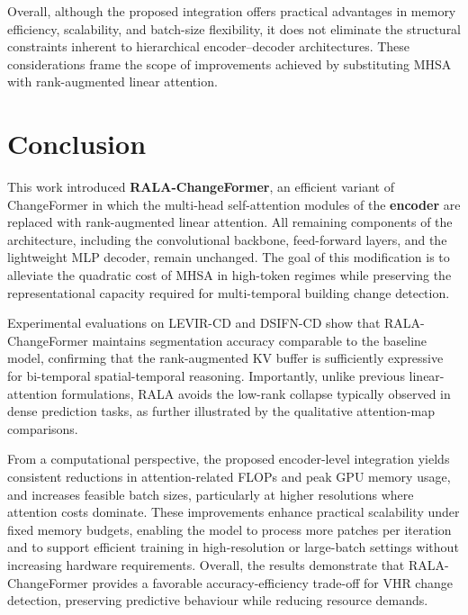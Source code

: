 \documentclass[runningheads]{llncs}
\begin{document}
\medskip
\noindent  Overall, although the proposed integration offers practical
advantages in memory efficiency, scalability, and batch-size flexibility, it
does not eliminate the structural constraints inherent to hierarchical
encoder--decoder architectures. These considerations frame the scope of
improvements achieved by substituting MHSA with rank-augmented linear attention.

\section{Conclusion}
\label{sec:conclusion}

This work introduced \textbf{RALA-ChangeFormer}, an efficient variant of
ChangeFormer in which the multi-head self-attention modules of the
\textbf{encoder} are replaced with rank-augmented linear attention. All
remaining components of the architecture, including the convolutional backbone,
feed-forward layers, and the lightweight MLP decoder, remain unchanged. The
goal of this modification is to alleviate the quadratic cost of MHSA in
high-token regimes while preserving the representational capacity required for
multi-temporal building change detection.

Experimental evaluations on LEVIR-CD and DSIFN-CD show that RALA-ChangeFormer
maintains segmentation accuracy comparable to the baseline model, confirming
that the rank-augmented KV buffer is sufficiently expressive for bi-temporal
spatial-temporal reasoning. Importantly, unlike previous linear-attention
formulations, RALA avoids the low-rank collapse typically observed in dense
prediction tasks, as further illustrated by the qualitative attention-map
comparisons.

From a computational perspective, the proposed encoder-level integration yields
consistent reductions in attention-related FLOPs and peak GPU memory usage, and
increases feasible batch sizes, particularly at higher resolutions where
attention costs dominate. These improvements enhance practical scalability under
fixed memory budgets, enabling the model to process more patches per iteration
and to support efficient training in high-resolution or large-batch settings
without increasing hardware requirements. Overall, the results demonstrate that
RALA-ChangeFormer provides a favorable accuracy-efficiency trade-off for VHR
change detection, preserving predictive behaviour while reducing resource
demands.
\end{document}
